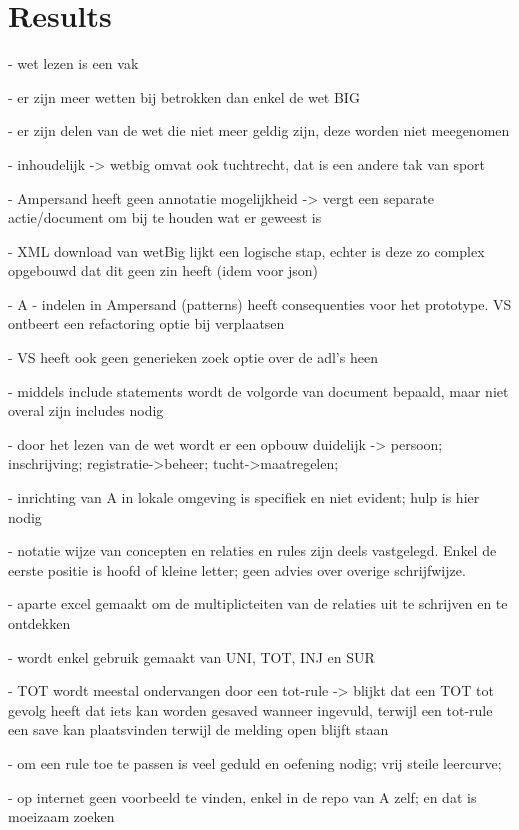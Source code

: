 \newpage
\section{Results} \label{Results}

- wet lezen is een vak

- er zijn meer wetten bij betrokken dan enkel de wet BIG

- er zijn delen van de wet die niet meer geldig zijn, deze worden niet meegenomen

- inhoudelijk -> wetbig omvat ook tuchtrecht, dat is een andere tak van sport

- Ampersand heeft geen annotatie mogelijkheid -> vergt een separate actie/document om bij te houden wat er geweest is

- XML download van wetBig lijkt een logische stap, echter is deze zo complex opgebouwd dat dit geen zin heeft (idem voor json)

- A - indelen in Ampersand (patterns) heeft consequenties voor het prototype. VS ontbeert een refactoring optie bij verplaatsen

- VS heeft ook geen generieken zoek optie over de adl's heen

- middels include statements wordt de volgorde van document bepaald, maar niet overal zijn includes nodig

- door het lezen van de wet wordt er een opbouw duidelijk -> persoon; inschrijving; registratie->beheer; tucht->maatregelen; 

- inrichting van A in lokale omgeving is specifiek en niet evident; hulp is hier nodig

- notatie wijze van concepten en relaties en rules zijn deels vastgelegd. Enkel de eerste positie is hoofd of kleine letter; geen advies over overige schrijfwijze.

- aparte excel gemaakt om de multiplicteiten van de relaties uit te schrijven en te ontdekken

- wordt enkel gebruik gemaakt van UNI, TOT, INJ en SUR

- TOT wordt meestal ondervangen door een tot-rule -> blijkt dat een TOT tot gevolg heeft dat iets kan worden gesaved wanneer ingevuld, terwijl een tot-rule een save kan plaatsvinden terwijl de melding open blijft staan

- om een rule toe te passen is veel geduld en oefening nodig; vrij steile leercurve; 

- op internet geen voorbeeld te vinden, enkel in de repo van A zelf; en dat is moeizaam zoeken

